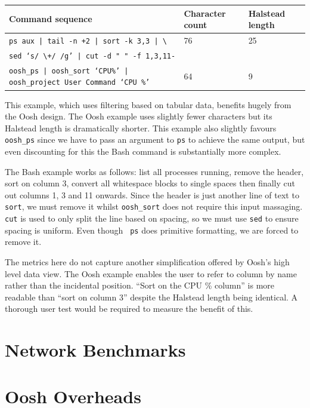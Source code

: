 \documentclass[12pt,twoside,notitlepage]{report}
\begin{document}
\begin{tabular}{|l|l|l|}
\hline
Command sequence & Character count & Halstead length \\
\hline
{\tt ps aux | tail -n +2 | sort -k 3,3 | \textbackslash} & 76 & 25\\
{\tt sed `s/ \textbackslash+/ /g' | cut -d " " -f 1,3,11-} & & \\
\hline
{\tt oosh\_ps | oosh\_sort `CPU\%' | oosh\_project User Command `CPU \%'} & 64 &
9 \\
\hline
\end{tabular}

This example, which uses filtering based on tabular data, benefits
hugely from the Oosh design. The Oosh example uses slightly fewer
characters but its Halstead length is dramatically shorter. This
example also slightly favours {\tt oosh\_ps} since we have to pass an
argument to {\tt ps} to achieve the same output, but even discounting
for this the Bash command is substantially more complex.

The Bash example works as follows: list all processes running, remove the
header, sort on column 3, convert all whitespace blocks to single spaces then
finally cut out columns 1, 3 and 11 onwards. Since the header is just another
line of text to {\tt sort}, we must remove it whilst {\tt oosh\_sort} does not
require this input massaging. {\tt cut} is used to only split the line based on
spacing, so we must use {\tt sed} to ensure spacing is uniform. Even though {\tt
  ps} does primitive formatting, we are forced to remove it.

The metrics here do not capture another simplification offered by Oosh's high
level data view. The Oosh example enables the user to refer to column by name
rather than the incidental position. ``Sort on the CPU \% column'' is more
readable than ``sort on column 3'' despite the Halstead length being
identical. A thorough user test would be required to measure the benefit of
this.


\section{Network Benchmarks}

\section{Oosh Overheads}
\end{document}
